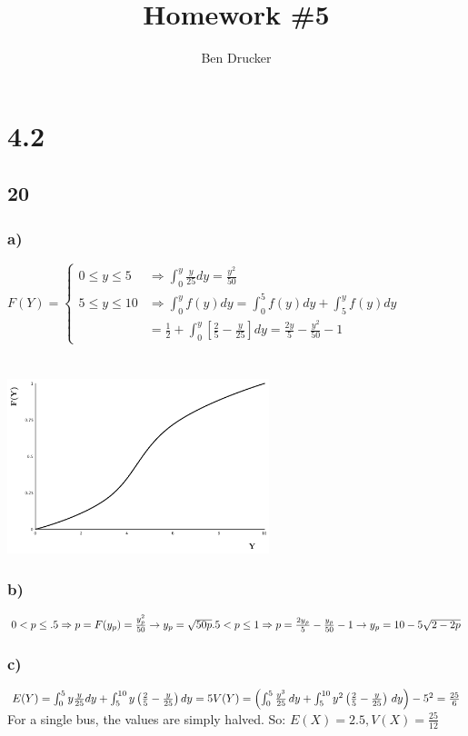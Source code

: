 \documentclass{article}
\newcommand{\hwkNum}{5}
\newcommand{\hwkAuthors}{Ben Drucker}
\begin{document}
\title{Homework \#\hwkNum}
\author{\hwkAuthors}
\date{}

\maketitle


\section*{4.2}
	\subsection*{20}
		\subsubsection*{a)}
			$F(Y) = \begin{cases}
				0 \leq y \leq 5 &\Rightarrow \int_0^y \frac{y}{25}dy = \frac{y^2}{50} \\
				5 \leq y \leq 10 &\Rightarrow \int_0^y f(y)dy = \int_0^5 f(y)dy + \int_5^y f(y)dy \\
				&= \frac{1}{2} + \int_0^y\left [ \frac{2}{5} - \frac{y}{25} \right ] dy = \frac{2y}{5} - \frac{y^2}{50} -1
			\end{cases}$ \\ \\ \\
			\includegraphics[height=2in]{4-2--20a}
		\subsubsection*{b)}
			$ 0 < p \leq .5 \Rightarrow p=F(y_p) = \frac{y_p^2}{50} \rightarrow y_p = \sqrt{50p} \\
			.5 < p \leq 1 \Rightarrow p = \frac{2y_p}{5} - \frac{y_p}{50}-1 \rightarrow y_p = 10-5\sqrt{2-2p}$
		\subsubsection*{c)}
			$E(Y) =\int_0^5 y\frac{y}{25}dy + \int_5^{10}y \left ( \frac{2}{5} - \frac{y}{25} \right )dy =5 \\
			V(Y) = \left(\int_0^5 \frac{y^3}{25} \, dy+\int_5^{10} y^2 \left(\frac{2}{5}-\frac{y}{25}\right) \, dy\right)-5^2 = \frac{25}{6} $\\
			For a single bus, the values are simply halved. So: $E(X) =2.5, V(X) = \frac{25}{12}$
					
\end{document}
